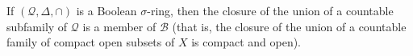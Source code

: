 If $(\mathcal{Q}, \Delta, \cap)$ is a Boolean $\sigma$-ring, then the closure of the union of a countable subfamily of $\mathcal{Q}$ is a member of $\mathcal{B}$ (that is, the closure of the union of a countable family of compact open subsets of $X$ is compact and open).
